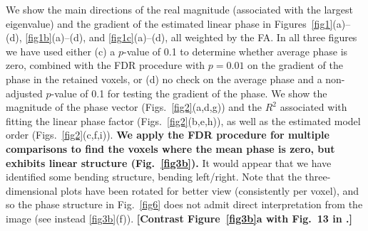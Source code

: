 \documentclass[authoryear,preprint,12pt]{elsarticle}
\begin{document}
We show the main directions of the real magnitude (associated with the
largest eigenvalue) and the gradient of the estimated linear phase in
Figures~\ref{fig1}(a)--(d), \ref{fig1b}(a)--(d), and
\ref{fig1c}(a)--(d), all weighted by the FA.  In all three figures we
have used either (c) a $p$-value of 0.1 to determine whether average
phase is zero, combined with the FDR procedure with $p=0.01$ on the
gradient of the phase in the retained voxels, or (d) no check on the
average phase and a non-adjusted $p$-value of 0.1 for testing the
gradient of the phase.
We show the magnitude of the phase vector (Figs.~\ref{fig2}(a,d,g))
and the $R^2$ associated with fitting the linear phase factor
(Figs.~\ref{fig2}(b,e,h)), as well as the estimated model order
(Figs.~\ref{fig2}(c,f,i)).  \textbf{We apply the FDR procedure for
  multiple comparisons \citep{Benjamini,gen-laz-nic:thresholding} to
  find the voxels where the mean phase is zero, but exhibits linear
  structure (Fig.~\ref{fig3b}).}
It would appear that we have identified some bending structure,
bending left/right.  Note that the three-dimensional plots have been
rotated for better view (consistently per voxel), and so the phase
structure in Fig.~\ref{fig6} does not admit direct interpretation from
the image (see instead \ref{fig3b}(f)).  \textbf{[Contrast
    Figure~\ref{fig3b}a with Fig.~13 in \citet{jon:studying}.]}
\end{document}
